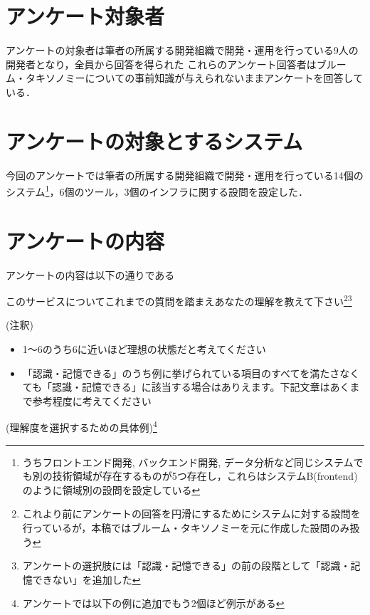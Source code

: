 \section{アンケート対象者}
アンケートの対象者は筆者の所属する開発組織で開発・運用を行っている9人の開発者となり，全員から回答を得られた
これらのアンケート回答者はブルーム・タキソノミーについての事前知識が与えられないままアンケートを回答している．

\section{アンケートの対象とするシステム}
今回のアンケートでは筆者の所属する開発組織で開発・運用を行っている14個のシステム\footnote{うちフロントエンド開発, バックエンド開発, データ分析など同じシステムでも別の技術領域が存在するものが5つ存在し，これらはシステムB(frontend)のように領域別の設問を設定している}，6個のツール，3個のインフラに関する設問を設定した．

\section{アンケートの内容}
アンケートの内容は以下の通りである\newline

このサービスについてこれまでの質問を踏まえあなたの理解を教えて下さい\footnote{これより前にアンケートの回答を円滑にするためにシステムに対する設問を行っているが，本稿ではブルーム・タキソノミーを元に作成した設問のみ扱う}\footnote{アンケートの選択肢には「認識・記憶できる」の前の段階として「認識・記憶できない」を追加した}\newline

(注釈)
\begin{itemize}
    \item 1～6のうち6に近いほど理想の状態だと考えてください
    \item 「認識・記憶できる」のうち例に挙げられている項目のすべてを満たさなくても「認識・記憶できる」に該当する場合はありえます。下記文章はあくまで参考程度に考えてください
\end{itemize}
(理解度を選択するための具体例)\footnote{アンケートでは以下の例に追加でもう2個ほど例示がある}

\renewcommand{\arraystretch}{1.5} %
\scriptsize

